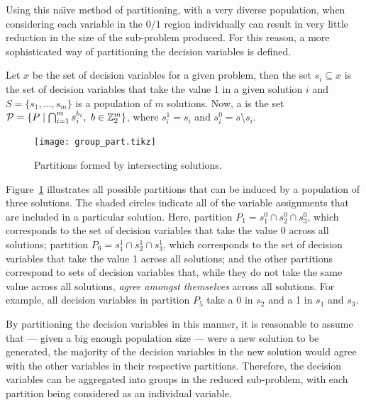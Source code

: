\documentclass[preprint]{elsarticle}
\begin{document}
Using this na{\"\i}ve method of partitioning, with a very diverse population, when considering each variable in the $0/1$ region individually can result in very little reduction in the size of the sub-problem produced. For this reason, a more sophisticated way of partitioning the decision variables is defined.

\begin{definition}\label{prop:part}
Let $x$ be the set of decision variables for a given problem, then the set $s_i \subseteq x$ is the set of decision variables that take the value 1 in a given solution $i$ and $S = \{s_1,\dots,s_m\}$ is a population of $m$ solutions. Now, a  is the set ${\cal P} = \{P \mid \bigcap_{i=1}^{m} s^{b_i}_i,\ b \in \mathbb{Z}_2^m\}$, 
where $s_i^1 = s_i$ and $s_i^0 = s \setminus s_i$.
\end{definition}

\begin{figure}[h!]
\centering
\texttt{[image: group\_part.tikz]}
\caption[Partitions formed by intersecting solutions]{Partitions formed by intersecting solutions.}
\label{fig:group_part}
\end{figure}

Figure~\ref{fig:group_part} illustrates all possible partitions that can be induced by a population of three solutions. The shaded circles indicate all of the variable assignments that are included in a particular solution. Here, partition $P_1=s^0_1 \cap s^0_2 \cap s^0_3$, which corresponds to the set of decision variables that take the value 0 across all solutions; partition $P_6=s^1_1 \cap s^1_2 \cap s^1_3$, which corresponds to the set of decision variables that take the value 1 across all solutions; and the other partitions correspond to sets of decision variables that, while they do not take the same value across all solutions, \emph{agree amongst themselves} across all solutions. For example, all decision variables in partition $P_5$ take a 0 in $s_2$ and a 1 in $s_1$ and $s_3$.
 
By partitioning the decision variables in this manner, it is reasonable to assume that --- given a big enough population size --- were a new solution to be generated, the majority of the decision variables in the new solution would agree with the other variables in their respective partitions. Therefore, the decision variables can be aggregated into groups in the reduced sub-problem, with each partition being considered as an individual variable. 
\end{document}
